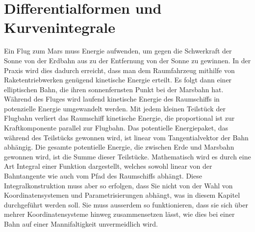 %
%
%
\chapter{Differentialformen und Kurvenintegrale
\label{chapter:kurvenintegral}}

\noindent
Ein Flug zum Mars muss Energie aufwenden, um gegen die Schwerkraft der
Sonne von der Erdbahn aus zu der 
Entfernung von der Sonne zu gewinnen.
%
%
In der Praxis wird dies dadurch erreicht, dass man dem Raumfahrzeug
mithilfe von Raketentriebwerken genügend kinetische Energie erteilt.
%
%
Es folgt dann einer elliptischen Bahn, die ihren sonnenfernsten Punkt
bei der Marsbahn hat.
%
%
Während des Fluges wird laufend kinetische Energie des Raumschiffs in
potenzielle Energie umgewandelt werden.
Mit jedem kleinen Teilstück der Flugbahn verliert das Raumschiff 
kinetische Energie, die proportional ist zur Kraftkomponente parallel
zur Flugbahn. 
Das potentielle Energiepaket, das während des Teilstücks gewonnen wird,
ist linear vom Tangentialvektor der Bahn abhängig.
Die gesamte potentielle Energie, die zwischen Erde und Marsbahn
gewonnen wird, ist die Summe dieser Teilstücke.
Mathematisch wird es durch eine Art Integral einer Funktion dargestellt,
welches sowohl linear von der Bahntangente wie auch vom Pfad des
Raumschiffs abhängt.
Diese Integralkonstruktion muss aber so erfolgen, dass Sie nicht von der
Wahl von Koordinatensystemen und Parametrisierungen abhängt, was in
diesem Kapitel durchgeführt werden soll.
Sie muss ausserdem so funktionieren, dass sie sich über mehrer
Koordinatensysteme hinweg zusammensetzen lässt, wie dies bei einer
Bahn auf einer Mannifaltigkeit unvermeidlich wird.






\uebungsabschnitt

\begin{uebungsaufgaben}
\end{uebungsaufgaben}
\enduebungsabschnitt

